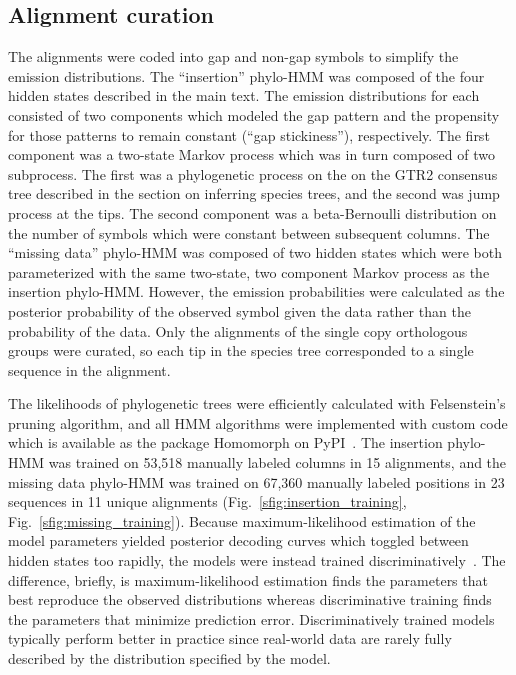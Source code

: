 \subsection{Alignment curation}
The alignments were coded into gap and non-gap symbols to simplify the emission distributions. The ``insertion'' phylo-HMM was composed of the four hidden states described in the main text. The emission distributions for each consisted of two components which modeled the gap pattern and the propensity for those patterns to remain constant (``gap stickiness''), respectively. The first component was a two-state Markov process which was in turn composed of two subprocess. The first was a phylogenetic process on the on the GTR2 consensus tree described in the section on inferring species trees, and the second was jump process at the tips. The second component was a beta-Bernoulli distribution on the number of symbols which were constant between subsequent columns. The ``missing data'' phylo-HMM was composed of two hidden states which were both parameterized with the same two-state, two component Markov process as the insertion phylo-HMM. However, the emission probabilities were calculated as the posterior probability of the observed symbol given the data rather than the probability of the data. Only the alignments of the single copy orthologous groups were curated, so each tip in the species tree corresponded to a single sequence in the alignment.

The likelihoods of phylogenetic trees were efficiently calculated with Felsenstein's pruning algorithm, and all HMM algorithms were implemented with custom code which is available as the package Homomorph on PyPI~\cite{Felsenstein1981}. The insertion phylo-HMM was trained on 53,518 manually labeled columns in 15 alignments, and the missing data phylo-HMM was trained on 67,360 manually labeled positions in 23 sequences in 11 unique alignments (Fig.~\ref{sfig:insertion_training}, Fig.~\ref{sfig:missing_training}). Because maximum-likelihood estimation of the model parameters yielded posterior decoding curves which toggled between hidden states too rapidly, the models were instead trained discriminatively~\cite{Krogh1999}. The difference, briefly, is maximum-likelihood estimation finds the parameters that best reproduce the observed distributions whereas discriminative training finds the parameters that minimize prediction error. Discriminatively trained models typically perform better in practice since real-world data are rarely fully described by the distribution specified by the model.

